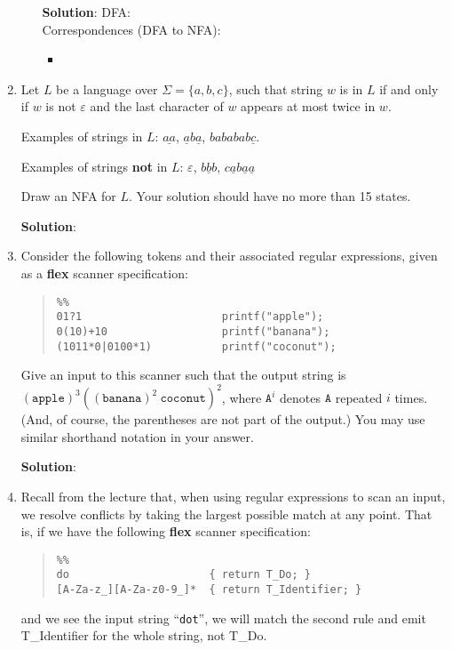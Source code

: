 \documentclass[11pt]{article}
\renewcommand{\epsilon}{\varepsilon}
\begin{document}
\begin{enumerate}
\begin{enumerate}
    \textbf{Solution}: DFA: \\

    Correspondences (DFA to NFA):
    \begin{itemize}
        \item %
    \end{itemize}
\end{enumerate}

\newpage

\item Let $L$ be a language over $\Sigma = \{a, b, c\}$, such that string $w$ is in $L$ if and only if $w$ is not $\epsilon$ and the last character of $w$ appears at most twice in $w$.

Examples of strings in $L$: $\underline{aa}$, $\underline{a}b\underline{a}$, $bababab\underline{c}$.

Examples of strings \textbf{not} in $L$: $\epsilon$, $\underline{bbb}$, $c\underline{a}b\underline{a}\underline{a}$

Draw an NFA for $L$.  Your solution should have no more than 15 states.

\textbf{Solution}:

\newpage

\item Consider the following tokens and their associated regular expressions, given as a \textbf{flex} scanner specification:
\begin{quote}
\begin{lstlisting}
%%
01?1                      printf("apple");
0(10)+10                  printf("banana");
(1011*0|0100*1)           printf("coconut");
\end{lstlisting}
\end{quote}
Give an input to this scanner such that the output string is $(\mathtt{apple})^3 ((\mathtt{banana})^2 \ \mathtt{coconut})^2$, where $\mathtt{A}^i$ denotes $\mathtt{A}$ repeated $i$ times.   (And, of course, the parentheses are not part of the output.)  You may use similar shorthand notation in your answer.

\textbf{Solution}:
\[
\]


\newpage

\item Recall from the lecture that, when using regular expressions to scan an input, we resolve conflicts by taking the largest possible match at any point. That is, if we have the following \textbf{flex} scanner specification:
\begin{quote}
\begin{lstlisting}
%%
do                      { return T_Do; }
[A-Za-z_][A-Za-z0-9_]*  { return T_Identifier; }
\end{lstlisting}
\end{quote}
and we see the input string ``\texttt{dot}'', we will match the second rule and emit T\_Identifier for the whole string, not T\_Do.


\end{enumerate}
\end{document}
